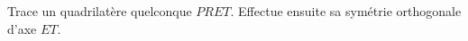 %
%
	Trace un quadrilatère quelconque \(PRET\). Effectue ensuite sa symétrie orthogonale d'axe \(ET\).
